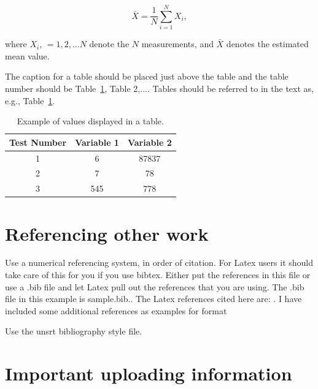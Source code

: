 \begin{equation}
\bar{X} = \frac{1}{N} \sum_{i=1}^{N} X_i ,
\label{Eq:1}
\end{equation}

\noindent
where $X_i$, $=1,2,...N$ denote the $N$ measurements, and $\bar{X}$ denotes the estimated mean value. 


The caption for a table should be placed just above the table and the table number should be Table~\ref{Tab:1}, Table 2,.... Tables should be referred to in the text as, e.g., Table~\ref{Tab:1}.

\begin{table}[H]
\caption{Example of values displayed in a table.}
\label{Tab:1}
\begin{center}
\begin{tabular}{c c c } 
 \hline
 \textbf{Test Number} &  \textbf{Variable 1}& \textbf{Variable 2}  \\ [0.5ex] 
 \hline
 1 & 6 & 87837 \\ 
 \hline
 2 & 7 & 78  \\
 \hline
 3 & 545 & 778 \\ [1ex] 
 \hline
\end{tabular}
\end{center}
\end{table}

\section{Referencing other work}

\noindent
Use a numerical referencing system, in order of citation.  For Latex users it should take care of this for you if you use bibtex.   Either put the references in this file or use a .bib file and let Latex pull out the references that you are using.  The .bib file in this example is sample.bib..  The Latex references cited here are:  \cite{latexcompanion, knuthwebsite}.  I have included some additional references as examples for format \cite{Poulsen1, Ryherd2007, Tang2006, May96,  Zwicker_Fastl_2006, ANSI_S3_4}

\vspace{\baselineskip}

Use the unsrt bibliography style file.  


\section{Important uploading information}

